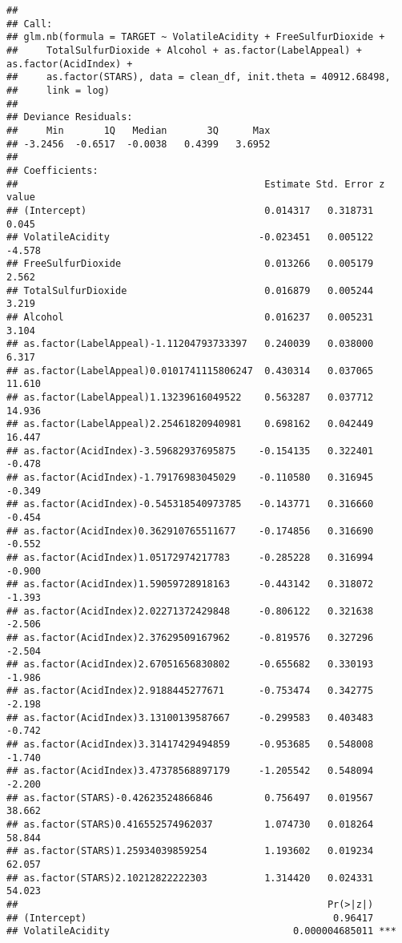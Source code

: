 \documentclass[
]{article}
\begin{document}
\begin{verbatim}
## 
## Call:
## glm.nb(formula = TARGET ~ VolatileAcidity + FreeSulfurDioxide + 
##     TotalSulfurDioxide + Alcohol + as.factor(LabelAppeal) + as.factor(AcidIndex) + 
##     as.factor(STARS), data = clean_df, init.theta = 40912.68498, 
##     link = log)
## 
## Deviance Residuals: 
##     Min       1Q   Median       3Q      Max  
## -3.2456  -0.6517  -0.0038   0.4399   3.6952  
## 
## Coefficients:
##                                           Estimate Std. Error z value
## (Intercept)                               0.014317   0.318731   0.045
## VolatileAcidity                          -0.023451   0.005122  -4.578
## FreeSulfurDioxide                         0.013266   0.005179   2.562
## TotalSulfurDioxide                        0.016879   0.005244   3.219
## Alcohol                                   0.016237   0.005231   3.104
## as.factor(LabelAppeal)-1.11204793733397   0.240039   0.038000   6.317
## as.factor(LabelAppeal)0.0101741115806247  0.430314   0.037065  11.610
## as.factor(LabelAppeal)1.13239616049522    0.563287   0.037712  14.936
## as.factor(LabelAppeal)2.25461820940981    0.698162   0.042449  16.447
## as.factor(AcidIndex)-3.59682937695875    -0.154135   0.322401  -0.478
## as.factor(AcidIndex)-1.79176983045029    -0.110580   0.316945  -0.349
## as.factor(AcidIndex)-0.545318540973785   -0.143771   0.316660  -0.454
## as.factor(AcidIndex)0.362910765511677    -0.174856   0.316690  -0.552
## as.factor(AcidIndex)1.05172974217783     -0.285228   0.316994  -0.900
## as.factor(AcidIndex)1.59059728918163     -0.443142   0.318072  -1.393
## as.factor(AcidIndex)2.02271372429848     -0.806122   0.321638  -2.506
## as.factor(AcidIndex)2.37629509167962     -0.819576   0.327296  -2.504
## as.factor(AcidIndex)2.67051656830802     -0.655682   0.330193  -1.986
## as.factor(AcidIndex)2.9188445277671      -0.753474   0.342775  -2.198
## as.factor(AcidIndex)3.13100139587667     -0.299583   0.403483  -0.742
## as.factor(AcidIndex)3.31417429494859     -0.953685   0.548008  -1.740
## as.factor(AcidIndex)3.47378568897179     -1.205542   0.548094  -2.200
## as.factor(STARS)-0.42623524866846         0.756497   0.019567  38.662
## as.factor(STARS)0.416552574962037         1.074730   0.018264  58.844
## as.factor(STARS)1.25934039859254          1.193602   0.019234  62.057
## as.factor(STARS)2.10212822222303          1.314420   0.024331  54.023
##                                                      Pr(>|z|)    
## (Intercept)                                           0.96417    
## VolatileAcidity                                0.000004685011 ***

\end{verbatim}
\end{document}
